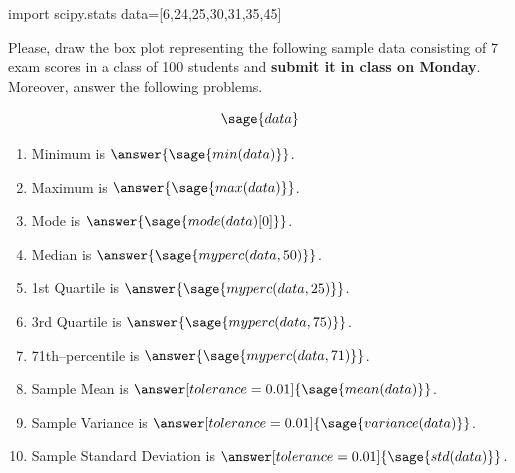 \documentclass{ximera}
\begin{document}
\begin{problem}
\begin{sagesilent}
import scipy.stats
data=[6,24,25,30,31,35,45]
\end{sagesilent}
Please, draw the box plot representing the following sample data consisting of 7 exam scores in a class of 100 students and \textbf{submit it in class on Monday}. Moreover, answer the following problems.

$$\sage{data}$$

\begin{enumerate}
    \item Minimum is $\answer{\sage{min(data)}}$.
    \item Maximum is $\answer{\sage{max(data)}}$.
    \item Mode is $\answer{\sage{mode(data)[0]}}$.
    \item Median is $\answer{\sage{myperc(data,50)}}$.
    \item 1st Quartile is $\answer{\sage{myperc(data,25)}}$.
    \item 3rd Quartile is $\answer{\sage{myperc(data,75)}}$.
    \item 71th--percentile is $\answer{\sage{myperc(data,71)}}$.
    \item Sample Mean is $\answer[tolerance=0.01]{\sage{mean(data)}}$.
    \item Sample Variance is $\answer[tolerance=0.01]{\sage{variance(data)}}$.
    \item Sample Standard Deviation is $\answer[tolerance=0.01]{\sage{std(data)}}$.
\end{enumerate}
\end{problem}
\end{document}
